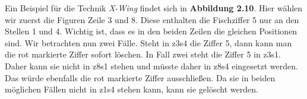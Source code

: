Ein Beispiel für die Technik \textit{X-Wing} findet sich in \textbf{Abbildung 2.10}. Hier wählen wir zuerst die Figuren Zeile 3 und 8. Diese enthalten die Fischziffer 5 nur an den Stellen 1 und 4. Wichtig ist, dass es in den beiden Zeilen die gleichen Positionen sind. Wir betrachten nun zwei Fälle. Steht in z3s4 die Ziffer 5, dann kann man die rot markierte Ziffer sofort löschen. In Fall zwei steht die Ziffer 5 in z3s1. Daher kann sie nicht in z8s1 stehen und müsste daher in z8s4 eingesetzt werden. Das würde ebenfalls die rot markierte Ziffer ausschließen. Da sie in beiden möglichen Fällen nicht in z1s4 stehen kann, kann sie gelöscht werden.